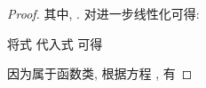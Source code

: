 \begin{proof}
\begin{comment}
            \nonumber &=\sum^n_{k=1}[ (h_k(u^k)-h_k(u^k_0))-(h_k(v^k)-h_k(v^k_0))]^2\\
            \nonumber &=\sum^n_{k=1}[(h_k(u^k)-h_k(u^k_0))^2+(h_k(v^k)-h_k(v^k_0))^2]\\
            \nonumber &\quad-2\sum^n_{k=1}(h_k(u^k)-h_k(u^k_0))(h_k(v^k)-h_k(v^k_0)) \\
            \nonumber &\leq \bar{\beta}^2\sum^n_{k=1}[ (u^k-u^k_0)^2+(v^k-v^k_0)^2]
            -2\sum^n_{k=1}(h_k(u^k)-h_k(u^k_0))(h_k(v^k)-h_k(v^k_0))\\
            \nonumber &=\bar{\beta}^2\sum^n_{k=1}[(u^k-u^k_0)-(v^k-v^k_0)]^2+\varrho\\
            &=\bar{\beta}^2\|(u-u_0)-(v-v_0)\|^2+\varrho,
            \end{comment}
           其中, .
            对进一步线性化可得:
            \begin{comment}\label{equ:13}
            \nonumber \varrho&\leq\sum^n_{k=1}[2\bar{\beta}^2(u^k-u^k_0)(v^k-v^k_0)+(h_k(u^k)-h_k(u^k_0))^2+(h_k(v^k)-h_k(v^k_0))^2]\\
            \nonumber &\leq\sum^n_{k=1}[2\bar{\beta}^2(u^k-u^k_0)(v^k-v^k_0)+\bar{\beta}^2(u^k-u^k_0)^2+\bar{\beta}^2(v^k-v^k_0)^2]\\
            \nonumber &=\bar{\beta}^2\sum^n_{k=1}(u^k-u^k_0+v^k-v^k_0)^2\\
            &=\bar{\beta}^2\| u-u_0+v-v_0 \|^2.
            \end{comment}
        将式 代入式 可得
            \begin{comment}\label{equ:up1}
            \nonumber &\quad\|(h(u)-h(u_0))-(h(v)-h(v_0))\|^2\\
            &\leq\bar{\beta}^2\|(u-u_0)-(v-v_0)\|^2+\bar{\beta}^2\| u-u_0+v-v_0 \|^2.
            \end{comment}
        因为属于函数类, 根据方程 , 有
            \begin{comment}\label{equ:up2}
            \nonumber &\quad\|(u(t)-u_0)-(v(t)-v_0)\|\\
            \nonumber &=\|\int^t_0[f(u(s))-f(v(s))]ds+(\xi-\zeta)t\|\\
            \nonumber &\leq\int^t_0\|f(u(s))-f(v(s))\|ds+\|\xi-\zeta\|t\\
            \nonumber &\leq l_1\int^t_0\|u(s)-v(s)\|ds+|\xi-\zeta\|t\\
             &\leq l_1\int^t_0\|(u(s)-u_0)-(v(s)-v_0)\|ds+(\|\xi-\zeta\|+l_1\|u_0-v_0\|)t.
            \end{comment}

\end{proof}
